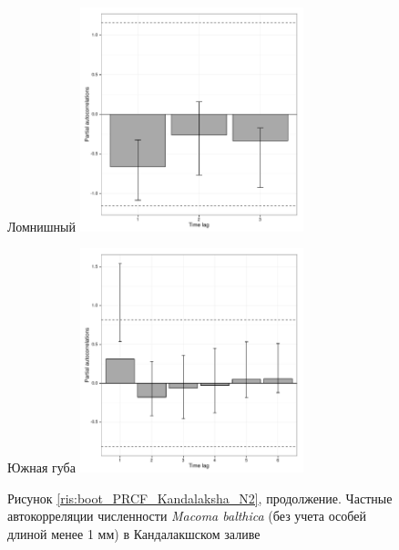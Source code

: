 \documentclass[12pt, a4paper]{disser}
\begin{document}
\begin{figure}[ht]
	\begin{minipage}[b]{.46\linewidth}
	\begin{center}
	{\tiny Ломнишный}
	\includegraphics[width=65mm]{../White_Sea/dynamic_N_N1/boot_PRCF_Lomnishniy_.pdf}
	\end{center}
	\end{minipage}
%
	\hfil %
%
	\begin{minipage}[b]{.46\linewidth}
	\begin{center}
	{\tiny Южная губа}
	\includegraphics[width=65mm]{../White_Sea/dynamic_N_N1/boot_PRCF_YuG_.pdf}
	\end{center}
	\end{minipage}

\begin{center}
Рисунок \ref{ris:boot_PRCF_Kandalaksha_N2}, продолжение. Частные автокорреляции численности {\it Macoma balthica} (без учета особей длиной менее 1 мм) в Кандалакшском заливе
\end{center}
	\end{figure}
\end{document}
